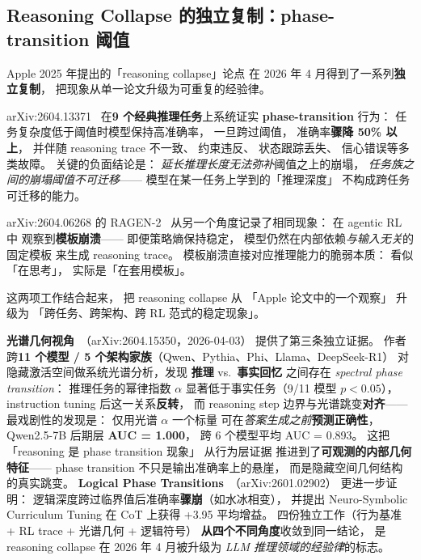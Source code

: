 \subsection{Reasoning Collapse 的独立复制：phase-transition 阈值}

Apple 2025 年提出的「reasoning collapse」论点
在 2026 年 4 月得到了一系列\textbf{独立复制}，
把现象从单一论文升级为可重复的经验律。

arXiv:2604.13371~\cite{complexitylimits2026}
在\textbf{9 个经典推理任务}上系统证实
\textbf{phase-transition} 行为：
任务复杂度低于阈值时模型保持高准确率，
一旦跨过阈值，
准确率\textbf{骤降 50\% 以上}，
并伴随 reasoning trace 不一致、
约束违反、
状态跟踪丢失、
信心错误等多类故障。
关键的负面结论是：
\emph{延长推理长度无法弥补}阈值之上的崩塌，
\emph{任务族之间的崩塌阈值不可迁移}——
模型在某一任务上学到的「推理深度」
不构成跨任务可迁移的能力。

arXiv:2604.06268 的 RAGEN-2~\cite{ragen2_2604}
从另一个角度记录了相同现象：
在 agentic RL 中
观察到\textbf{模板崩溃}——
即便策略熵保持稳定，
模型仍然在内部依赖\emph{与输入无关}的固定模板
来生成 reasoning trace。
模板崩溃直接对应推理能力的脆弱本质：
看似「在思考」，
实际是「在套用模板」。

这两项工作结合起来，
把 reasoning collapse 从
「Apple 论文中的一个观察」
升级为
「跨任务、跨架构、跨 RL 范式的稳定现象」。

\textbf{光谱几何视角}~\cite{spectralthought2604}（arXiv:2604.15350，2026-04-03）
提供了第三条独立证据。
作者跨\textbf{11 个模型 / 5 个架构家族}（Qwen、Pythia、Phi、Llama、DeepSeek-R1）
对隐藏激活空间做系统光谱分析，发现
\textbf{推理} vs.\ \textbf{事实回忆} 之间存在
\emph{spectral phase transition}：
推理任务的幂律指数 $\alpha$ 显著低于事实任务（9/11 模型 $p < 0.05$），
instruction tuning 后这一关系\textbf{反转}，
而 reasoning step 边界与光谱跳变\textbf{对齐}——
最戏剧性的发现是：
仅用光谱 $\alpha$ 一个标量
可在\emph{答案生成之前}\textbf{预测正确性}，
Qwen2.5-7B 后期层 \textbf{AUC = 1.000}，
跨 6 个模型平均 AUC = 0.893。
这把「reasoning 是 phase transition 现象」
从行为层证据
推进到了\textbf{可观测的内部几何特征}——
phase transition 不只是输出准确率上的悬崖，
而是隐藏空间几何结构的真实跳变。
\textbf{Logical Phase Transitions}~\cite{logicalphase2026}（arXiv:2601.02902）
更进一步证明：
逻辑深度跨过临界值后准确率\textbf{骤崩}（如水冰相变），
并提出 Neuro-Symbolic Curriculum Tuning 在 CoT 上获得 +3.95 平均增益。
四份独立工作（行为基准 + RL trace + 光谱几何 + 逻辑符号）
\textbf{从四个不同角度}收敛到同一结论，
是 reasoning collapse 在 2026 年 4 月被升级为
\emph{LLM 推理领域的经验律}的标志。

